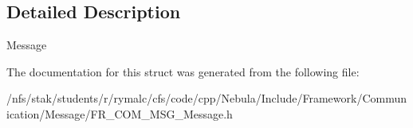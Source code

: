 \subsection{Detailed Description}
Message 

The documentation for this struct was generated from the following file:\begin{DoxyCompactItemize}
\item 
/nfs/stak/students/r/rymalc/cfs/code/cpp/Nebula/Include/Framework/Communication/Message/FR\_\-COM\_\-MSG\_\-Message.h\end{DoxyCompactItemize}
